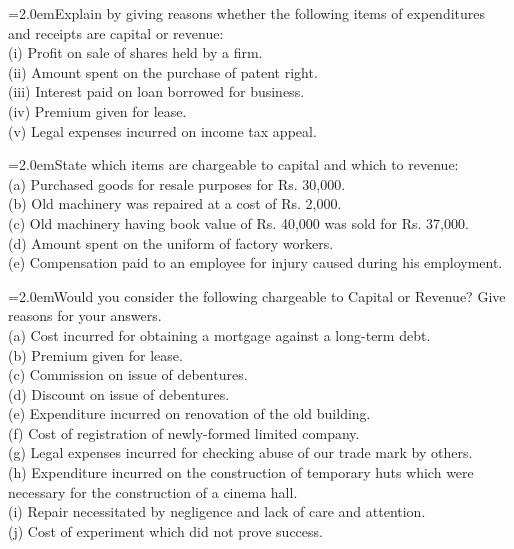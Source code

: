 \documentclass[11pt,a4paper]{article}
\newcommand{\lqn}[2]{\Needspace{6\baselineskip}\par\medskip\noindent\hangindent=2.0em\hangafter=1\makebox[2.0em][l]{\textbf{#1.}}#2\par}
\begin{document}
\lqn{130}{Explain by giving reasons whether the following items of expenditures and receipts are capital or revenue:\\
(i) Profit on sale of shares held by a firm.\\
(ii) Amount spent on the purchase of patent right.\\
(iii) Interest paid on loan borrowed for business.\\
(iv) Premium given for lease.\\
(v) Legal expenses incurred on income tax appeal.\par
}
\lqn{131}{State which items are chargeable to capital and which to revenue:\\
(a) Purchased goods for resale purposes for Rs. 30,000.\\
(b) Old machinery was repaired at a cost of Rs. 2,000.\\
(c) Old machinery having book value of Rs. 40,000 was sold for Rs. 37,000.\\
(d) Amount spent on the uniform of factory workers.\\
(e) Compensation paid to an employee for injury caused during his employment.\par
}
\lqn{132}{Would you consider the following chargeable to Capital or Revenue? Give reasons for your answers.\\
(a) Cost incurred for obtaining a mortgage against a long-term debt.\\
(b) Premium given for lease.\\
(c) Commission on issue of debentures.\\
(d) Discount on issue of debentures.\\
(e) Expenditure incurred on renovation of the old building.\\
(f) Cost of registration of newly-formed limited company.\\
(g) Legal expenses incurred for checking abuse of our trade mark by others.\\
(h) Expenditure incurred on the construction of temporary huts which were necessary for the construction of a cinema hall.\\
(i) Repair necessitated by negligence and lack of care and attention.\\
(j) Cost of experiment which did not prove success.\par
}
\end{document}
